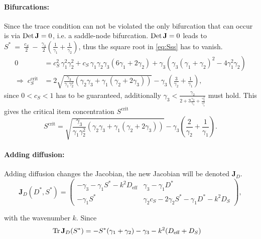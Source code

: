 \paragraph{Bifurcations:}

Since the trace condition can not be violated the only bifurcation that can occur is via $\operatorname{Det} \mathbf{J}=0$, i.e. a saddle-node bifurcation. $\operatorname{Det} \mathbf{J}=0$ leads to $S^* ~=~ \frac{c_S}{2}~-~\frac{\gamma_3}{2}\left(\frac{1}{\gamma_1}+\frac{1}{\gamma_2}\right)$, thus the square root in \eqref{eq:Sss} has to vanish.
%
\begin{align}
 \nonumber 0 &= c_S^2\,\gamma_1^2\gamma_2^2+c_S\,\gamma_1\gamma_2\gamma_3(6\gamma_1+2\gamma_2)+\gamma_3(\gamma_3(\gamma_1+\gamma_2)^2-4\gamma_1^2\gamma_2)\\
 \Rightarrow\; c_S^{\text{crit}} &= 2\sqrt{\frac{\gamma_3}{\gamma_1\gamma_2^2}\left(\gamma_2\gamma_3+\gamma_1(\gamma_2+2\gamma_3)\right)}-\gamma_3\left(\frac{3}{\gamma_2}+\frac{1}{\gamma_1}\right),
\end{align}
%
since $0 < c_S < 1$ has to be guaranteed, additionally $\gamma_3 < \frac{\gamma_2}{2+3\frac{\gamma_2}{\gamma_1}+\frac{\gamma_2^2}{\gamma_1^2}}$ must hold. This gives the critical item concentration $S^\text{crit}$
%
\begin{equation}
 S^{\text{crit}}=\sqrt{\frac{\gamma_3}{\gamma_1\gamma_2^2}\left(\gamma_2\gamma_3+\gamma_1(\gamma_2+2\gamma_3)\right)}-\gamma_3\left(\frac{2}{\gamma_2}+\frac{1}{\gamma_1}\right).
\end{equation}

\paragraph{Adding diffusion:}

Adding diffusion changes the Jacobian, the new Jacobian will be denoted $\mathbf{J}_D$.
%
\begin{equation*}
 \mathbf{J}_D(D^*,S^*) = 
 \begin{pmatrix}
  -\gamma_3-\gamma_1 S^*-k^2 D_{\text{eff}} & \gamma_3-\gamma_1 D^*\\ 
  -\gamma_1 S^* &  \gamma_2 c_S -2\gamma_2 S^*-\gamma_1 D^*-k^2 D_S
 \end{pmatrix},
\end{equation*}

with the wavenumber $k$. Since 
\begin{align}
\operatorname{Tr} \mathbf{J}_D(S^*) &= -S^*(\gamma_1+\gamma_2)-\gamma_3-k^2(D_{\text{eff}}+D_S)
\end{align}

